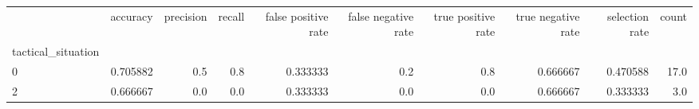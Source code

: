 \begin{tabular}{lrrrrrrrrr}
\toprule
{} &  accuracy &  precision &  recall &  false positive rate &  false negative rate &  true positive rate &  true negative rate &  selection rate &  count \\
tactical\_situation &           &            &         &                      &                      &                     &                     &                 &        \\
\midrule
0                  &  0.705882 &        0.5 &     0.8 &             0.333333 &                  0.2 &                 0.8 &            0.666667 &        0.470588 &   17.0 \\
2                  &  0.666667 &        0.0 &     0.0 &             0.333333 &                  0.0 &                 0.0 &            0.666667 &        0.333333 &    3.0 \\
\bottomrule
\end{tabular}
